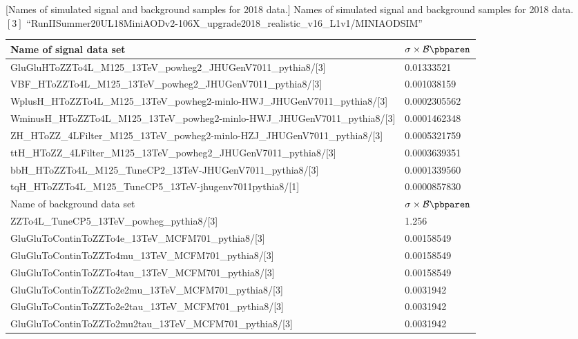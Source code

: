 \begin{table}[h]
    \small
        [Names of simulated signal and background samples for 2018 data.]
        {Names of simulated signal and background samples for 2018 data. \\
        $[3]$ ``RunIISummer20UL18MiniAODv2-106X\_upgrade2018\_realistic\_v16\_L1v1/MINIAODSIM''}
	\begin{tabular}{|ll|}
		\hline      
        Name of signal data set & $\sigma \times \mathcal{B}\pbparen$ \\
        \hline
		GluGluHToZZTo4L\_M125\_13TeV\_powheg2\_JHUGenV7011\_pythia8/[3]	&	0.01333521	\\
		VBF\_HToZZTo4L\_M125\_13TeV\_powheg2\_JHUGenV7011\_pythia8/[3]	&	0.001038159	\\
		WplusH\_HToZZTo4L\_M125\_13TeV\_powheg2-minlo-HWJ\_JHUGenV7011\_pythia8/[3]	&	0.0002305562	\\
		WminusH\_HToZZTo4L\_M125\_13TeV\_powheg2-minlo-HWJ\_JHUGenV7011\_pythia8/[3]	&	0.0001462348	\\
		ZH\_HToZZ\_4LFilter\_M125\_13TeV\_powheg2-minlo-HZJ\_JHUGenV7011\_pythia8/[3]	&	0.0005321759	\\
		ttH\_HToZZ\_4LFilter\_M125\_13TeV\_powheg2\_JHUGenV7011\_pythia8/[3]	&	0.0003639351	\\
		bbH\_HToZZTo4L\_M125\_TuneCP2\_13TeV-JHUGenV7011\_pythia8/[3]	&	0.0001339560	\\
		tqH\_HToZZTo4L\_M125\_TuneCP5\_13TeV-jhugenv7011\-pythia8/[1]	&	0.0000857830	\\
		\hline	
		\hline	
        Name of background data set & $\sigma \times \mathcal{B}\pbparen$ \\
		\hline	
		ZZTo4L\_TuneCP5\_13TeV\_powheg\_pythia8/[3]	&	1.256	\\
		GluGluToContinToZZTo4e\_13TeV\_MCFM701\_pythia8/[3]	&	0.00158549	\\
		GluGluToContinToZZTo4mu\_13TeV\_MCFM701\_pythia8/[3]	&	0.00158549	\\
		GluGluToContinToZZTo4tau\_13TeV\_MCFM701\_pythia8/[3]	&	0.00158549	\\
		GluGluToContinToZZTo2e2mu\_13TeV\_MCFM701\_pythia8/[3]	&	0.0031942	\\
		GluGluToContinToZZTo2e2tau\_13TeV\_MCFM701\_pythia8/[3]	&	0.0031942	\\
		GluGluToContinToZZTo2mu2tau\_13TeV\_MCFM701\_pythia8/[3]	&	0.0031942	\\
        \hline
        \end{tabular}
    \label{table:2018_simSamples}
\end{table}

